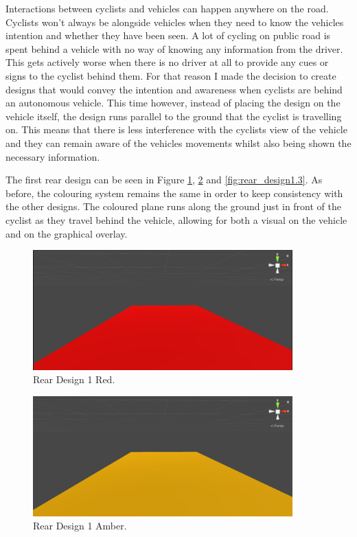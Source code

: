 \documentclass{l4proj}
\begin{document}
Interactions between cyclists and vehicles can happen anywhere on the road. Cyclists won't always be alongside vehicles when they need to know the vehicles intention and whether they have been seen. A lot of cycling on public road is spent behind a vehicle with no way of knowing any information from the driver. This gets actively worse when there is no driver at all to provide any cues or signs to the cyclist behind them. For that reason I made the decision to create designs that would convey the intention and awareness when cyclists are behind an autonomous vehicle. This time however, instead of placing the design on the vehicle itself, the design runs parallel to the ground that the cyclist is travelling on. This means that there is less interference with the cyclists view of the vehicle and they can remain aware of the vehicles movements whilst also being shown the necessary information.

The first rear design can be seen in Figure \ref{fig:rear_design1.1}, \ref{fig:rear_design1.2} and \ref{fig:rear_design1.3}. As before, the colouring system remains the same in order to keep consistency with the other designs. The coloured plane runs along the ground just in front of the cyclist as they travel behind the vehicle, allowing for both a visual on the vehicle and on the graphical overlay.

\begin{figure}[H]
    \centering
    \includegraphics[width=10cm]{images/rear_design1.1.png}
    \caption{Rear Design 1 Red.}
    \label{fig:rear_design1.1}
\end{figure}

\begin{figure}[H]
    \centering
    \includegraphics[width=10cm]{images/rear_design1.2.png}
    \caption{Rear Design 1 Amber.}
    \label{fig:rear_design1.2}
\end{figure}
\end{document}

